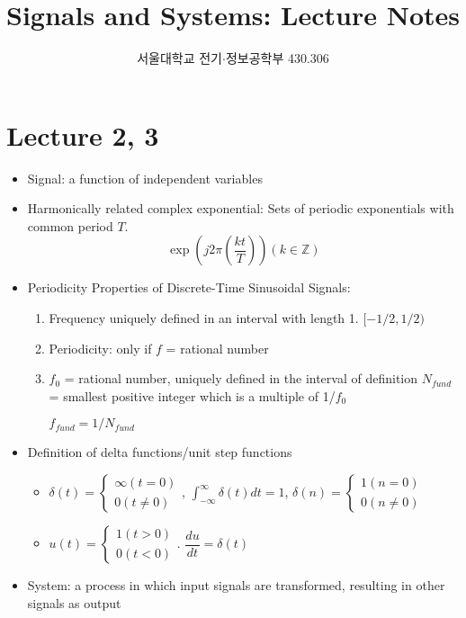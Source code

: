 \documentclass{article}
\title{Signals and Systems: Lecture Notes}
\author{서울대학교 전기$\cdot$정보공학부 430.306}
\begin{document}
\maketitle
\section{Lecture 2, 3}
\begin{itemize}

\item Signal: a function of independent variables

\item Harmonically related complex exponential:
Sets of periodic exponentials with common period $T$.\[\exp\left(j2\pi\left(\dfrac{kt}{T}\right)\right)(k\in\mathbb{Z})\]

\item Periodicity Properties of Discrete-Time Sinusoidal Signals:
\begin{enumerate}
\item Frequency uniquely defined in an interval with length 1. $[-1/2, 1/2)$

\item Periodicity: only if $f$ = rational number

\item $f_0$ = rational number, uniquely defined in the interval of definition
$N_{fund}$ = smallest positive integer which is a multiple of 1/$f_0$

$f_{fund}=1/N_{fund}$
\end{enumerate}
\item Definition of delta functions/unit step functions
\begin{itemize}
    \item $\delta(t)=\begin{cases}\infty(t=0)\\
    0(t\neq0)\end{cases}$, 
    $\displaystyle\int_{-\infty}^{\infty}{\delta(t)dt}=1$, $\delta(n) = \begin{cases}1(n=0)\\0(n\neq0)\end{cases}$
    \item $u(t) = \begin{cases}1(t>0)\\0(t<0)\end{cases}$. $\dfrac{du}{dt}=\delta(t)$
\end{itemize}

\item System: a process in which input signals are transformed, resulting in other signals as output


\end{itemize}
\end{document}

